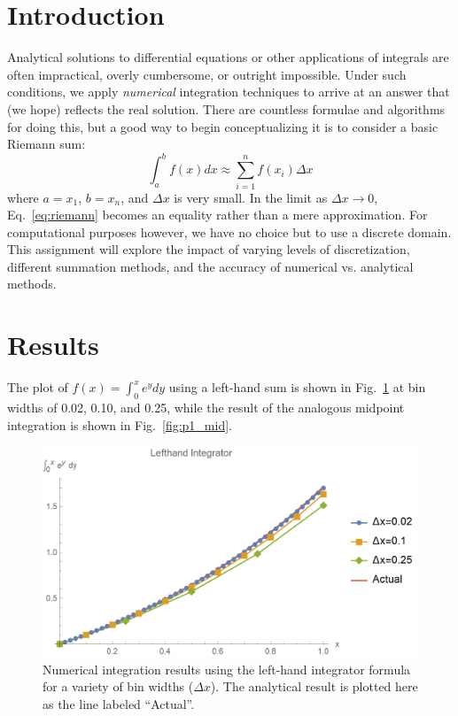 \documentclass{article}
\author{\hwauthor}
\title{\hwtitle}
\date{\hwdate}
\begin{document}
\maketitle
\thispagestyle{fancy}

\section{Introduction}

Analytical solutions to differential equations or other applications of integrals are often impractical, overly cumbersome, or outright impossible. Under such conditions, we apply \emph{numerical} integration techniques to arrive at an answer that (we hope) reflects the real solution. There are countless formulae and algorithms for doing this, but a good way to begin conceptualizing it is to consider a basic Riemann sum:
\begin{equation}\label{eq:riemann}
    \int_a^b f(x) dx \approx \sum_{i=1}^n f(x_i) \Delta x
\end{equation}
where $a=x_1$, $b=x_n$, and $\Delta x$ is very small. In the limit as $\Delta x \to 0$, Eq.~\ref{eq:riemann} becomes an equality rather than a mere approximation. For computational purposes however, we have no choice but to use a discrete domain. This assignment will explore the impact of varying levels of discretization, different summation methods, and the accuracy of numerical vs. analytical methods.

\section{Results}

\bigskip
{}
\medskip

The plot of $f(x) = \int_0^x e^y dy$ using a left-hand sum is shown in Fig.~\ref{fig:p1_left} at bin widths of 0.02, 0.10, and 0.25, while the result of the analogous midpoint integration is shown in Fig.~\ref{fig:p1_mid}.

\begin{figure}[!h]
    \centering
    \includegraphics[width=4.75in]{homework2/P1_LH.png}
    \caption{Numerical integration results using the left-hand integrator formula for a variety of bin widths ($\Delta x$). The analytical result is plotted here as the line labeled ``Actual''.}
    \label{fig:p1_left}
\end{figure}
\end{document}
